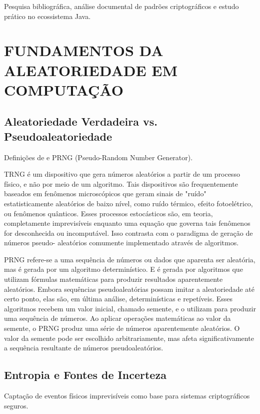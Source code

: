 \documentclass[
	12pt,				%
	openright,			%
	oneside,			%
	a4paper,			%
	portuguese,			%
	brazil				%
	]{abntex2}
\begin{document}
Pesquisa bibliográfica, análise documental de padrões criptográficos e estudo prático no ecossistema Java.

\chapter{FUNDAMENTOS DA ALEATORIEDADE EM COMPUTAÇÃO} %

\section{Aleatoriedade Verdadeira vs. Pseudoaleatoriedade}

Definições de  e PRNG (Pseudo-Random Number Generator).

TRNG é um dispositivo que gera números aleatórios a partir
de um processo físico, e não por meio de um algoritmo. Tais dispositivos são
frequentemente baseados em fenômenos microscópicos que geram sinais de "ruído"
estatisticamente aleatórios de baixo nível, como ruído térmico, efeito fotoelétrico, ou
fenômenos quânticos. Esses processos estocásticos são, em teoria, completamente
imprevisíveis enquanto uma equação que governa tais fenômenos for desconhecida
ou incomputável. Isso contrasta com o paradigma de geração de números pseudo-
aleatórios comumente implementado através de algoritmos.\cite{6.1DefinicaoTRNG}

PRNG refere-se a uma sequência de números ou dados que aparenta ser aleatória, 
mas é gerada por um algoritmo determinístico.
E é gerada por algoritmos que utilizam fórmulas matemáticas para produzir resultados aparentemente aleatórios. 
Embora sequências pseudoaleatórias possam imitar a aleatoriedade até certo ponto, elas são, 
em última análise, determinísticas e repetíveis.
Esses algoritmos recebem um valor inicial, chamado semente, 
e o utilizam para produzir uma sequência de números. 
Ao aplicar operações matemáticas ao valor da semente, 
o PRNG produz uma série de números aparentemente aleatórios. 
O valor da semente pode ser escolhido arbitrariamente, 
mas afeta significativamente a sequência resultante de números pseudoaleatórios.\cite{6.1DefinicaoPRNG}


\section{Entropia e Fontes de Incerteza}

Captação de eventos físicos imprevisíveis como base para sistemas criptográficos seguros.
\end{document}
